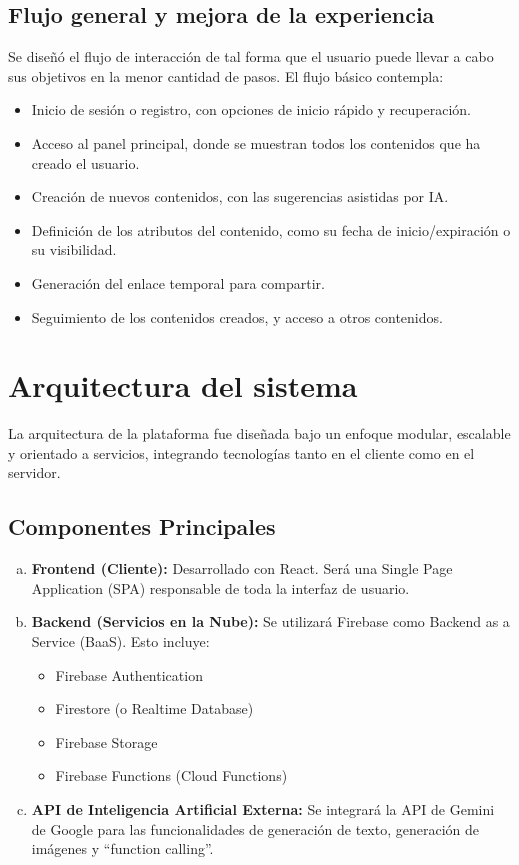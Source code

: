\documentclass[12pt,a4paper]{report}
\begin{document}
\subsection{Flujo general y mejora de la experiencia}

Se diseñó el flujo de interacción de tal forma que el usuario puede llevar a cabo sus objetivos en la menor cantidad de pasos. El flujo básico contempla:

\begin{itemize}
\item Inicio de sesión o registro, con opciones de inicio rápido y recuperación.
\item Acceso al panel principal, donde se muestran todos los contenidos que ha creado el usuario.
\item Creación de nuevos contenidos, con las sugerencias asistidas por IA.
\item Definición de los atributos del contenido, como su fecha de inicio/expiración o su visibilidad.
\item Generación del enlace temporal para compartir.
\item Seguimiento de los contenidos creados, y acceso a otros contenidos.
\end{itemize}

\section{Arquitectura del sistema}

La arquitectura de la plataforma fue diseñada bajo un enfoque modular, escalable y orientado a servicios, integrando tecnologías tanto en el cliente como en el servidor.

\subsection{Componentes Principales}

\begin{enumerate}[a.]
\item \textbf{Frontend (Cliente):} Desarrollado con React. Será una Single Page Application (SPA) responsable de toda la interfaz de usuario.

\item \textbf{Backend (Servicios en la Nube):} Se utilizará Firebase como Backend as a Service (BaaS). Esto incluye:
\begin{itemize}
\item Firebase Authentication
\item Firestore (o Realtime Database)
\item Firebase Storage
\item Firebase Functions (Cloud Functions)
\end{itemize}

\item \textbf{API de Inteligencia Artificial Externa:} Se integrará la API de Gemini de Google para las funcionalidades de generación de texto, generación de imágenes y ``function calling''.
\end{enumerate}
\end{document}
